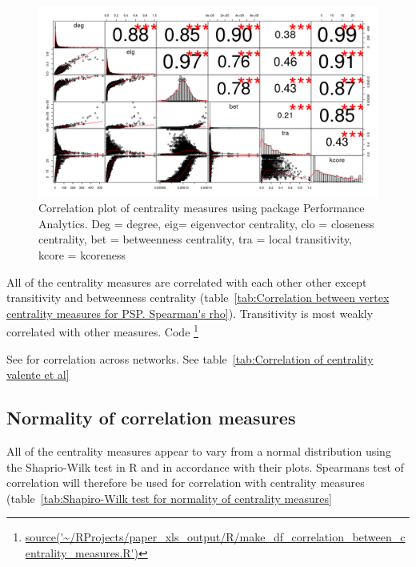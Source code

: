 \begin{figure}
    \centering
    \includegraphics[width=\textwidth]{Rplot_corr_spearman_using_package_performance_analytics.png}
    \caption{Correlation plot of centrality measures using package Performance Analytics. Deg = degree, eig= eigenvector centrality, clo = closeness centrality, bet = betweenness centrality, tra = local transitivity, kcore = kcoreness}
    \label{fig:Correlation plot centrality performance analytics}
\end{figure}



All of the centrality measures are correlated with each other other except transitivity and betweenness centrality  (table~\ref{tab:Correlation between vertex centrality measures for PSP. Spearman's rho}). Transitivity is most weakly correlated with other measures. Code \footnote{\url{source('~/RProjects/paper_xls_output/R/make_df_correlation_between_centrality_measures.R')}}



See \cite{oldham2019consistency} for correlation across networks. See table~\ref{tab:Correlation of centrality valente et al}

\subsection{Normality of correlation measures}
All of the centrality measures appear to vary from a normal distribution using the Shaprio-Wilk test in R and in accordance with their plots. Spearmans test of correlation will therefore be used for correlation with centrality measures (table~\ref{tab:Shapiro-Wilk test for normality of centrality measures}


